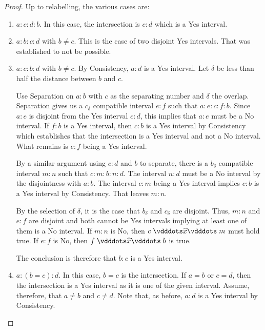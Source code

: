\documentclass[12pt]{article}
\begin{document}
\begin{proof}
    Up to relabelling, the various cases are: 
    \begin{enumerate}
        \item $a:c:d:b$. In this case, the intersection is $c:d$ which is a Yes interval. 
        \item $a:b:c:d$ with $b \neq c$. This is the case of two disjoint Yes intervals. That was established to not be possible. 
        
        \item $a:c:b:d$ with $b \neq c$. By Consistency, $a:d$ is a Yes interval. Let $\delta$ be less than half the distance between $b$ and $c$. 
        
        Use Separation on $a:b$ with $c$ as the separating number and $\delta$ the overlap. Separation gives us a $c_\delta$ compatible interval $e:f$ such that $a:e:c:f:b$. Since $a:e$ is disjoint from the Yes interval $c:d$, this implies that $a:e$ must be a No interval. If $f:b$ is a Yes interval, then $c:b$ is a Yes interval by Consistency which establishes that the intersection is a Yes interval and not a No interval. What remains is $e:f$ being a Yes interval.  

        By a similar argument using $c:d$ and $b$ to separate, there is a $b_\delta$ compatible interval $m:n$ such that $c:m:b:n:d$. The interval $n:d$ must be a No interval by the disjointness with $a:b$. The interval $c:m$ being a Yes interval implies $c:b$ is a Yes interval by Consistency. That leaves $m:n$.
        
        By the selection of $\delta$, it is the case that $b_\delta$ and $c_\delta$ are disjoint. Thus, $m:n$ and $e:f$ are disjoint and both cannot be Yes intervals implying at least one of them is a No interval. If $m:n$ is No, then $c \xora m$ must hold true. If $e:f$ is No, then $f \xora b$ is true. 

        The conclusion is therefore that $b:c$ is a Yes interval. 

        \item $a:(b=c):d$. In this case, $b=c$ is the intersection.  If $a=b$ or $c=d$, then the intersection is a Yes interval as it is one of the given interval. Assume, therefore, that $a \neq b$ and $c \neq d$. Note that, as before, $a:d$ is a Yes interval by Consistency.
        
        

\end{enumerate}
\end{proof}
\end{document}
